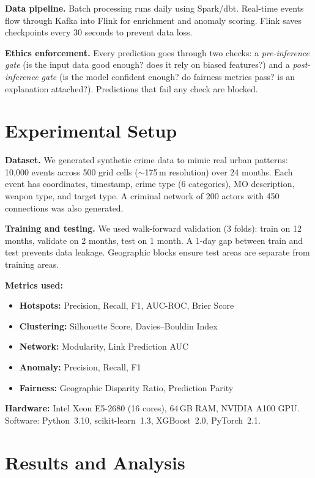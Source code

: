 \documentclass[a4paper,10pt,twocolumn]{article}
\begin{document}
\textbf{Data pipeline.} Batch processing runs daily using Spark/dbt. Real-time events flow through Kafka into Flink for enrichment and anomaly scoring. Flink saves checkpoints every 30 seconds to prevent data loss.

\textbf{Ethics enforcement.} Every prediction goes through two checks: a \emph{pre-inference gate} (is the input data good enough? does it rely on biased features?) and a \emph{post-inference gate} (is the model confident enough? do fairness metrics pass? is an explanation attached?). Predictions that fail any check are blocked.

\section{Experimental Setup}

\textbf{Dataset.} We generated synthetic crime data to mimic real urban patterns: 10,000 events across 500 grid cells ($\sim$175\,m resolution) over 24 months. Each event has coordinates, timestamp, crime type (6 categories), MO description, weapon type, and target type. A criminal network of 200 actors with 450 connections was also generated.

\textbf{Training and testing.} We used walk-forward validation (3 folds): train on 12 months, validate on 2 months, test on 1 month. A 1-day gap between train and test prevents data leakage. Geographic blocks ensure test areas are separate from training areas.

\textbf{Metrics used:}
\begin{itemize}
  \item \textbf{Hotspots:} Precision, Recall, F1, AUC-ROC, Brier Score
  \item \textbf{Clustering:} Silhouette Score, Davies--Bouldin Index
  \item \textbf{Network:} Modularity, Link Prediction AUC
  \item \textbf{Anomaly:} Precision, Recall, F1
  \item \textbf{Fairness:} Geographic Disparity Ratio, Prediction Parity
\end{itemize}

\textbf{Hardware:} Intel Xeon E5-2680 (16 cores), 64\,GB RAM, NVIDIA A100 GPU. Software: Python~3.10, scikit-learn~1.3, XGBoost~2.0, PyTorch~2.1.

\section{Results and Analysis}
\end{document}
